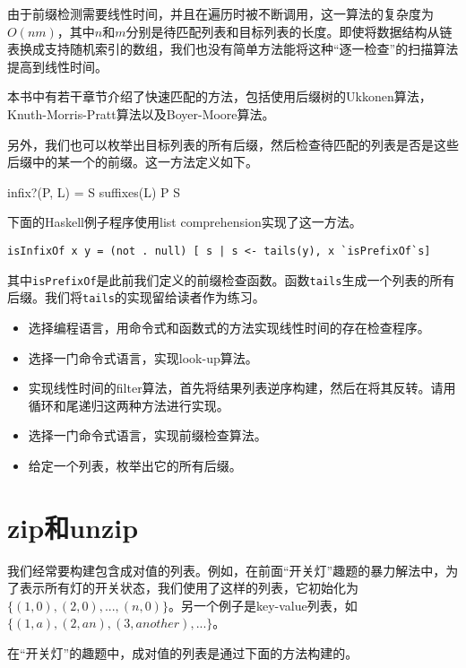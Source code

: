 \documentclass[UTF8]{article}
\begin{document}
由于前缀检测需要线性时间，并且在遍历时被不断调用，这一算法的复杂度为$O(nm)$，其中$n$和$m$分别是待匹配列表和目标列表的长度。即使将数据结构从链表换成支持随机索引的数组，我们也没有简单方法能将这种“逐一检查”的扫描算法提高到线性时间。

本书中有若干章节介绍了快速匹配的方法，包括使用后缀树的Ukkonen算法，Knuth-Morris-Pratt算法以及Boyer-Moore算法。

另外，我们也可以枚举出目标列表的所有后缀，然后检查待匹配的列表是否是这些后缀中的某一个的前缀。这一方法定义如下。

\be
infix?(P, L) = \exists S \in suffixes(L) \land P \subseteq S
\ee

下面的Haskell例子程序使用list comprehension实现了这一方法。

\lstset{language=Haskell}
\begin{lstlisting}
isInfixOf x y = (not . null) [ s | s <- tails(y), x `isPrefixOf`s]
\end{lstlisting}

其中\texttt{isPrefixOf}是此前我们定义的前缀检查函数。函数\texttt{tails}生成一个列表的所有后缀。我们将\texttt{tails}的实现留给读者作为练习。

\begin{Exercise}
\begin{itemize}
\item 选择编程语言，用命令式和函数式的方法实现线性时间的存在检查程序。
\item 选择一门命令式语言，实现look-up算法。
\item 实现线性时间的filter算法，首先将结果列表逆序构建，然后在将其反转。请用循环和尾递归这两种方法进行实现。
\item 选择一门命令式语言，实现前缀检查算法。
\item 给定一个列表，枚举出它的所有后缀。
\end{itemize}
\end{Exercise}

\section{zip和unzip}

我们经常要构建包含成对值的列表。例如，在前面“开关灯”趣题的暴力解法中，为了表示所有灯的开关状态，我们使用了这样的列表，它初始化为$\{(1, 0), (2, 0), ..., (n, 0)\}$。另一个例子是key-value列表，如$\{(1, a), (2, an), (3, another), ... \}$。

在“开关灯”的趣题中，成对值的列表是通过下面的方法构建的。
\end{document}
